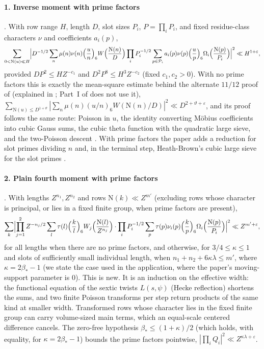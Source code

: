 \documentclass[11pt]{article}
\newcommand{\N}{\mathrm N}
\begin{document}
\paragraph{1. Inverse moment with prime factors}
\cite[Lemma lem:marked]{OAI78}. With row range $H$, length $D$, slot sizes $P_i$, $P=\prod_iP_i$, and fixed
residue-class characters $\nu$ and coefficients $a_i(p)$,
\begin{equation}\label{eq:inverse-moment}
 \sum_{0<\N(u)\ll H}\Bigl|D^{-1/2}\sum_n\mu(n)\nu(n)\Bigl(\frac un\Bigr)_6W\Bigl(\frac{\N(n)}D\Bigr)
 \prod_iP_i^{-1/2}\sum_{p\in\mathcal P_i}a_i(p)\nu(p)\Bigl(\frac up\Bigr)_6\Omega_i\Bigl(\frac{\N(p)}{P_i}\Bigr)\Bigr|^2
 \ll H^{1+\varepsilon},
\end{equation}
provided $DP^2\le HZ^{-c_1}$ and $D^2P^8\le H^3Z^{-c_2}$ (fixed $c_1,c_2>0$). With no prime factors this
is exactly the mean-square estimate behind the alternate $11/12$ proof of \cite{OAI1112}
(explained in \cite{guide1112}; Part~I of \cite{OAI78} does not use it),
$\sum_{\N(u)\le D^{1+\vartheta}}|\sum_n\mu(n)(u/n)_6W(\N(n)/D)|^2\ll D^{2+\vartheta+\varepsilon}$,
and its proof follows the same route: Poisson in $u$, the identity converting
M\"obius coefficients into cubic Gauss sums, the cubic theta function with
the quadratic large sieve, and the two-Poisson descent \cite[Sections 6--8]{guide1112}. With
prime factors the paper adds a reduction for slot primes dividing $n$ and, in the terminal step,
Heath-Brown's cubic large sieve for the slot primes \cite[Lemma lem:hybrid-energy]{OAI78}.

\paragraph{2. Plain fourth moment with prime factors}
\cite[Lemma lem:plain]{OAI78}. With lengths $Z^{n_1},Z^{n_2}$ and rows
$\N(k)\ll Z^{m'}$ (excluding rows whose character is principal, or lies in a fixed finite group, when prime factors are present),
\begin{equation}\label{eq:plain-moment}
 \sum_{k}\Bigl|\prod_{j=1}^2Z^{-n_j/2}\sum_l\tau(l)\Bigl(\frac kl\Bigr)_6W_j\Bigl(\frac{\N(l)}{Z^{n_j}}\Bigr)
 \cdot\prod_iP_i^{-1/2}\sum_p\tau(p)\nu_i(p)\Bigl(\frac kp\Bigr)_6\Omega_i\Bigl(\frac{\N(p)}{P_i}\Bigr)\Bigr|^2
 \ll Z^{m'+\varepsilon},
\end{equation}
for all lengths when there are no prime factors, and otherwise, for $3/4\le\kappa\le1$ and slots
of sufficiently small individual length, when
$n_1+n_2+6\kappa\lambda\le m'$, where $\kappa=2\beta_*-1$ (we state the case used in the application, where
the paper's moving-support parameter is $0$). This is new. It is an induction on the effective width: the functional equation of the
sextic twists $L(s,\psi)$ (Hecke reflection) shortens the sums, and two finite Poisson
transforms per step return products of the same kind at smaller width. Transformed rows whose
character lies in the fixed finite group can carry volume-sized main terms, which an
equal-scale centered difference cancels. The zero-free hypothesis $\beta_*\le(1+\kappa)/2$
(which holds, with equality, for $\kappa=2\beta_*-1$) bounds the prime factors pointwise,
$|\prod_iQ_i|^2\ll Z^{\kappa\lambda+\varepsilon}$.
\end{document}
